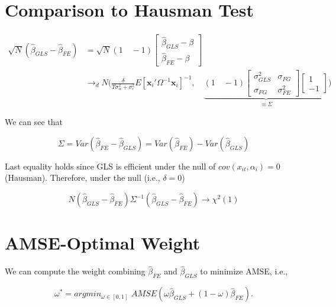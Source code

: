 \documentclass[12pt]{article}
\begin{document}
\section*{Comparison to Hausman Test}

\begin{align*}
\sqrt{N} (\widehat{\beta}_{GLS} - \widehat{\beta}_{FE}) & = \sqrt{N} (1 \quad -1)  \begin{bmatrix}
\widehat{\beta}_{GLS}-\beta\\
\widehat{\beta}_{FE}-\beta
\end{bmatrix} \\
& \rightarrow_d N \bigg(\frac{\delta}{T\sigma_\alpha^2 + \sigma_\epsilon^2}E[\mathbf{x}_i' \Omega^{-1} \mathbf{x}_i]^{-1}, \quad \underbrace{(1\quad -1) \begin{bmatrix}
\sigma_{GLS}^2 & \sigma_{FG}\\
\sigma_{FG} &\sigma_{FE}^2
\end{bmatrix}  \begin{bmatrix}
1\\
-1
\end{bmatrix}}_{\equiv \Sigma} \bigg )
\end{align*}

We can see that 

\[
\Sigma = Var(\widehat{\beta}_{FE} - \widehat{\beta}_{GLS}) = Var(\widehat{\beta}_{FE}) - Var(\widehat{\beta}_{GLS})
\]

Last equality holds since GLS is efficient under the null of $cov(x_{it}, \alpha_i)=0$ (Hausman). Therefore, under the null (i.e., $\delta=0$)

\[
N(\widehat{\beta}_{GLS}-\widehat{\beta}_{FE}) \Sigma^{-1} (\widehat{\beta}_{GLS} - \widehat{\beta}_{FE}) \rightarrow \chi^2(1)
\]


\section*{AMSE-Optimal Weight}

We can compute the weight combining $\widehat{\beta}_{FE}$ and $\widehat{\beta}_{GLS}$ to minimize AMSE, i.e.,

\[
\omega^{*} = argmin_{\omega\in [0,1]} \,\, AMSE(\omega\widehat{\beta}_{GLS} + (1-\omega) \widehat{\beta}_{FE}). 
\]
\end{document}
